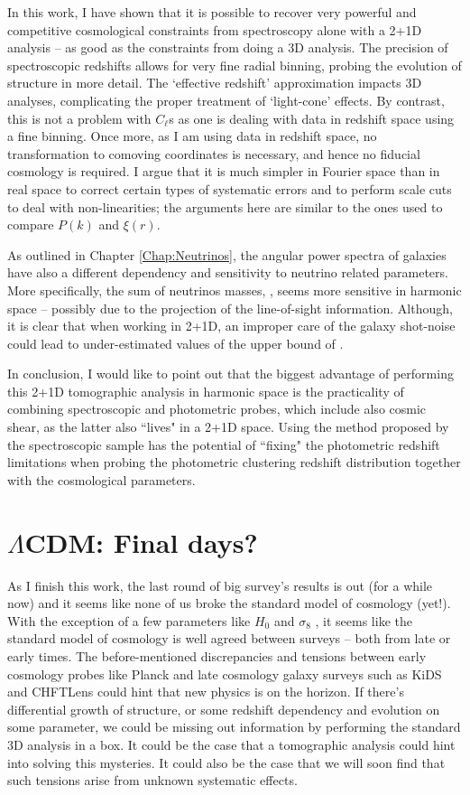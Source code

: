 \qquad In this work, I have shown that it is possible to recover very powerful and competitive cosmological constraints from spectroscopy alone with a 2+1D analysis -- as good as the constraints from doing a 3D analysis. The precision of spectroscopic redshifts allows for very fine radial binning, probing the evolution of structure in more detail. The `effective redshift' approximation impacts 3D analyses, complicating the proper treatment of `light-cone' effects. By contrast, this is not a problem with $C_{\ell}$s as one is dealing with data in redshift space using a fine binning. Once more, as I am using data in redshift space, no transformation to comoving coordinates is necessary, and hence no fiducial cosmology is required. I argue that it is much simpler in Fourier space than in real space to correct certain types of systematic errors and to perform scale cuts to deal with non-linearities; the arguments here are similar to the ones used to compare $P(k)$ and $\xi(r)$.

\qquad As outlined in Chapter \ref{Chap:Neutrinos}, the angular power spectra of galaxies have also a different dependency and sensitivity to neutrino related parameters. More specifically, the sum of neutrinos masses, \NM, seems more sensitive in harmonic space -- possibly due to the projection of the line-of-sight information. Although, it is clear that when working in 2+1D, an improper care of the galaxy shot-noise could lead to under-estimated values of the upper bound of \NM.

\qquad In conclusion, I would like to point out that the biggest advantage of performing this 2+1D tomographic analysis in harmonic space is the practicality of combining spectroscopic and photometric probes, which include also cosmic shear, as the latter also ``lives" in a 2+1D space. Using the method proposed by \cite{2016McLeod} the spectroscopic sample has the potential of ``fixing" the photometric redshift limitations when probing the photometric clustering redshift distribution together with the cosmological parameters.


\section{$\Lambda$CDM: Final days?}
\label{sec:conclusion:sec2}
As I finish this work, the last round of big survey's results is out (for a while now) and it seems like none of us broke the standard model of cosmology (yet!). With the exception of a few parameters like $H_0$ \citep{2018HubbleMortsell, Riess2018} and $\sigma_8$ \citep{2015MacCrann}, it seems like the standard model of cosmology is well agreed between surveys -- both from late or early times. The before-mentioned discrepancies and tensions between early cosmology probes like Planck and late cosmology galaxy surveys such as KiDS and CHFTLens could hint that new physics is on the horizon. If there's differential growth of structure, or some redshift dependency and evolution on some parameter, we could be missing out information by performing the standard 3D analysis in a box. It could be the case that a tomographic analysis could hint into solving this mysteries. It could also be the case that we will soon find that such tensions arise from unknown systematic effects.

